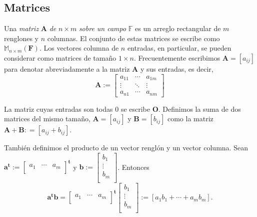         \subsection{Matrices}
            Una \textit{matriz} $\mathbf{A}$ \textit{de} $n \times m$ \textit{sobre un campo} $\mathbb{F}$ es un arreglo rectangular de  $m$ renglones y $n$ columnas. El conjunto de estas matrices se escribe como $\mathbb{M}_{n \times m}(\mathbf{F})$. Los vectores columna de $n$ entradas, en particular, se pueden considerar como matrices de tamaño $1 \times n$. Frecuentemente escribimos $\mathbf{A} = [a_{ij}]$ para denotar abreviadamente a la matriz $\mathbf{A}$ y sus entradas, es decir,
                $$
                \mathbf{A}:= \begin{bmatrix}
                a_{11} & \cdots & a_{1m}\\ 
                \vdots & \ddots &\vdots\\ 
                a_{n1} &\cdots  & a_{nm} 
                \end{bmatrix}
                $$

            La matriz cuyas entradas son todas $0$ se escribe $\mathbf{O}$.
            Definimos la suma de dos matrices del mismo tamaño, $\mathbf{A} = [a_{ij}]$ y $\mathbf{B} = [b_{ij}]$ como la matriz $\mathbf{A+B}: = [a_{ij} + b_{ij}]$.

            También definimos el producto de un vector renglón y un vector columna. Sean $\mathbf{a}^{\mathbf{t}}:=\begin{bmatrix}
            a_{1} & \cdots & a_{m}\\ 
            \end{bmatrix}^{\mathbf{t}}$ y $\mathbf{b}:=\begin{bmatrix}
            b_{1} \\ 
            \vdots\\
            b_{m}\\ 
            \end{bmatrix}$. Entonces $$\mathbf{a}^{\mathbf{t}}\mathbf{b} = \begin{bmatrix}
            a_{1} & \cdots & a_{m}\\ 
            \end{bmatrix}^{\mathbf{t}} \begin{bmatrix}
            b_{1} \\ 
            \vdots\\
            b_{m}\\ 
            \end{bmatrix}:= [a_{1}b_{1} + \cdots + a_{m}b_{m}].$$

